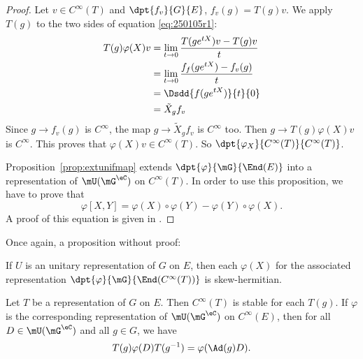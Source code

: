 \begin{proof}
	Let $v\in C^{\infty}(T)$ and $\dpt{f_v}{G}{E}$, $f_v(g)=T(g)v$. We apply $T(g)$ to the two sides of equation \eqref{eq:250105r1}:
	\begin{equation}
		\begin{split}
			T(g)\varphi(X)v&=\lim_{t\to 0}\frac{T(ge^{tX})v-T(g)v}{t}\\
			&=\lim_{t\to0}\frac{f_f(ge^{tX})-f_v(g)}{t}\\
			&=\Dsdd{ f(ge^{tX}) }{t}{0}\\
			&=\tilde X_gf_v
		\end{split}
	\end{equation}
	Since $g\to f_v(g)$ is $ C^{\infty}$, the map $g\to\tilde X_gf_v$ is $ C^{\infty}$ too. Then $g\to T(g)\varphi(X)v$ is $ C^{\infty}$. This proves that $\varphi(X)v\in C^{\infty}(T)$. So $\dpt{\varphi_X}{ C^{\infty}(T)}{ C^{\infty}(T)}$.

	Proposition~\ref{prop:extunifmap} extends $\dpt{\varphi}{\mG}{\End(E)}$ into a representation of $\mU(\mG^{\eC})$ on $ C^{\infty}(T)$. In order to use this proposition, we have to prove that
	\[
		\varphi[X,Y]=\varphi(X)\circ\varphi(Y)-\varphi(Y)\circ\varphi(X).
	\]
	A proof of this equation is given in \cite{Knapp_reprez}.


\end{proof}
Once again, a proposition without proof:

\begin{proposition}
	If $U$ is an unitary representation of $G$ on $E$, then each $\varphi(X)$ for the associated representation $\dpt{\varphi}{\mG}{\End( C^{\infty}(T))}$ is skew-hermitian.
\end{proposition}


\begin{proposition}
	Let $T$ be a representation of $G$ on $E$. Then $ C^{\infty}(T)$ is stable for each $T(g)$. If $\varphi$ is the corresponding representation of $\mU(\mG^{\eC})$ on $ C^{\infty}(E)$, then for all $D\in\mU(\mG^{\eC})$ and all $g\in G$, we have
	\[
		T(g)\varphi(D)T(g^{-1})=\varphi(\Ad(g)D).
	\]
\end{proposition}

